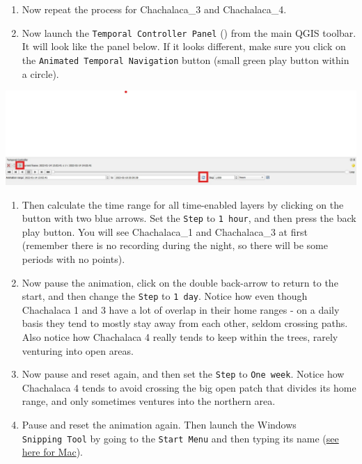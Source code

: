 \documentclass[
  letterpaper,
  DIV=11,
  numbers=noendperiod]{scrreprt}
\begin{document}
\begin{enumerate}
\def\labelenumi{(\arabic{enumi})}
\setcounter{enumi}{360}
\item
  Now repeat the process for Chachalaca\_3 and Chachalaca\_4.
\item
  Now launch the \texttt{Temporal\ Controller\ Panel}
  (\href{https://docs.qgis.org/3.34/en/_images/temporal.png}{}) from the
  main QGIS toolbar. It will look like the panel below. If it looks
  different, make sure you click on the
  \texttt{Animated\ Temporal\ Navigation} button (small green play
  button within a circle).
\end{enumerate}

\includegraphics{images/lab_14/lab14_fig5_time_panel.jpg}

\begin{enumerate}
\def\labelenumi{(\arabic{enumi})}
\setcounter{enumi}{362}
\item
  Then calculate the time range for all time-enabled layers by clicking
  on the button with two blue arrows. Set the \texttt{Step} to
  \texttt{1\ hour}, and then press the back play button. You will see
  Chachalaca\_1 and Chachalaca\_3 at first (remember there is no
  recording during the night, so there will be some periods with no
  points).
\item
  Now pause the animation, click on the double back-arrow to return to
  the start, and then change the \texttt{Step} to \texttt{1\ day}.
  Notice how even though Chachalaca 1 and 3 have a lot of overlap in
  their home ranges - on a daily basis they tend to mostly stay away
  from each other, seldom crossing paths. Also notice how Chachalaca 4
  really tends to keep within the trees, rarely venturing into open
  areas.
\item
  Now pause and reset again, and then set the \texttt{Step} to
  \texttt{One\ week}. Notice how Chachalaca 4 tends to avoid crossing
  the big open patch that divides its home range, and only sometimes
  ventures into the northern area.
\item
  Pause and reset the animation again. Then launch the Windows
  \texttt{Snipping\ Tool} by going to the \texttt{Start\ Menu} and then
  typing its name (\href{https://support.apple.com/en-gb/102618}{see
  here for Mac}).
\end{enumerate}
\end{document}
